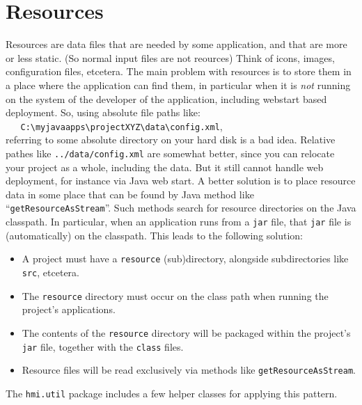 \section{Resources}

Resources are data files that are needed by some application, and that are more or less static.
(So normal input files are not reources) Think of icons, images, configuration files, etcetera.
The main problem with resources is to store them in a place where the application can find them, in particular when 
it is \emph{not} running on the system of the developer of the application, including webstart based deployment.
So, using absolute file paths like:\\
\verb#   C:\myjavaapps\projectXYZ\data\config.xml#,\\
referring to some absolute directory on your hard disk is a bad idea.  
Relative pathes like \verb#../data/config.xml# are somewhat better, since you can relocate your project as a whole, including the data.
But it still cannot handle web deployment, for instance via Java web start.
A better solution is to place resource data in some place that can be found by Java method like ``\verb#getResourceAsStream#''.
Such methods search for resource directories on the Java classpath. In particular, when an application 
runs from a \verb#jar# file, that \verb#jar# file is (automatically) on the classpath. 
This leads to the following solution:
\begin{itemize}
\item A project must have a \verb#resource# (sub)directory, alongside subdirectories like \verb#src#, etcetera.
\item The \verb#resource# directory must occur on the class path when running the project's applications.
\item The contents of the \verb#resource# directory will be packaged within the project's \verb#jar# file, 
together with the \verb#class# files.
\item Resource files will be read exclusively via methods like \verb#getResourceAsStream#.
\end{itemize}

The \verb#hmi.util# package includes a few helper classes for applying this pattern.

